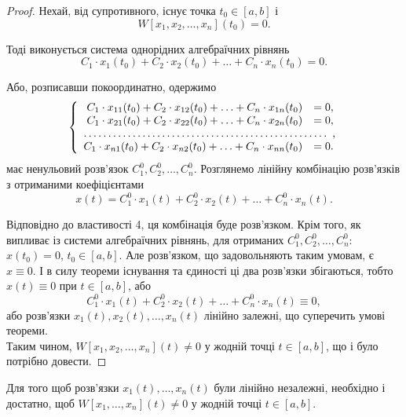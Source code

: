 \begin{proof}
	Нехай, від супротивного, існує точка $t_0 \in [a, b]$ і \[W[x_1, x_2, \ldots, x_n](t_0) = 0.\]

	Тоді виконується система однорідних алгебраїчних рівнянь \[C_1 \cdot x_1(t_0) + C_2 \cdot x_2(t_0) + \ldots + C_n \cdot x_n(t_0) = 0. \]

	Або, розписавши покоординатно, одержимо
	\begin{equation*}
		\left\{
			\begin{array}{rl}
				C_1 \cdot x_{11}(t_0) + C_2 \cdot x_{12}(t_0) + \ldots + C_n \cdot x_{1n}(t_0) &= 0, \\
				C_1 \cdot x_{21}(t_0) + C_2 \cdot x_{22}(t_0) + \ldots + C_n \cdot x_{2n}(t_0) &= 0, \\
				\hdotsfor{2}, \\
				C_1 \cdot x_{n1}(t_0) + C_2 \cdot x_{n2}(t_0) + \ldots + C_n \cdot x_{nn}(t_0) &= 0.
			\end{array}
		\right.
	\end{equation*}
 	має ненульовий розв'язок $C_1^0, C_2^0, \ldots, C_n^0$. Розглянемо лінійну комбінацію розв'язків з отриманими коефіцієнтами
 	\begin{equation*}
 		x(t) = C_1^0 \cdot x_1(t) + C_2^0 \cdot x_2(t) + \ldots + C_n^0 \cdot x_n(t).
 	\end{equation*}

	Відповідно до властивості 4, ця комбінація буде розв'язком. Крім того, як випливає із системи алгебраїчних рівнянь, для отриманих $C_1^0, C_2^0, \ldots, C_n^0$: $x(t_0) = 0$, $t_0 \in [a, b]$. Але розв'язком, що задовольняють таким умовам, є $x \equiv 0$. І в силу теореми існування та єдиності ці два розв’язки збігаються, тобто $x(t) \equiv 0$ при $t \in [a, b]$, або 
 	\begin{equation*}
 		C_1^0 \cdot x_1(t) + C_2^0 \cdot x_2(t) + \ldots + C_n^0 \cdot x_n(t) \equiv 0,
 	\end{equation*}
	або розв'язки $x_1(t), x_2(t), \ldots, x_n(t)$ лінійно залежні, що суперечить умові теореми.  \\

	Таким чином, $W[x_1, x_2, \ldots, x_n](t) \ne 0$ у жодній точці $t \in [a, b]$, що і було потрібно довести.
\end{proof}

\begin{theorem}
	Для того щоб розв'язки $x_1(t), \ldots, x_n(t)$ були лінійно незалежні, необхідно і достатно, щоб $W[x_1, \ldots, x_n](t) \ne 0$ у жодній точці $t \in [a, b]$.
\end{theorem}

